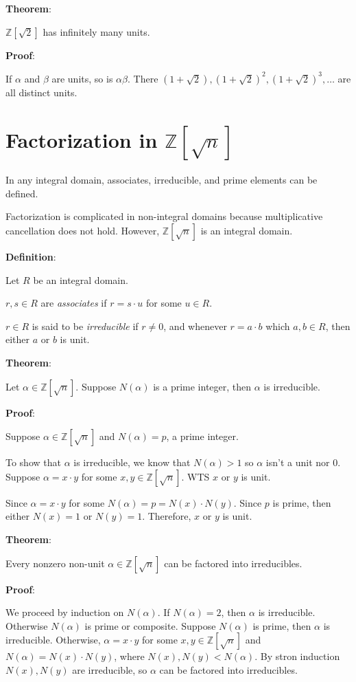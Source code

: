 \documentclass{article}
\begin{document}
\begin{multicols*}{2}
\textbf{Theorem}:

$\mathbb{Z}[\sqrt{2}]$ has infinitely many units.

\textbf{Proof}:

If $\alpha$ and $\beta$ are units, so is $\alpha\beta$. There $(1 + \sqrt{2}), (1 + \sqrt{2})^2, (1 + \sqrt{2})^3,\dots$ are all distinct units.

\section{Factorization in $\mathbb{Z}[\sqrt{n}]$}

In any integral domain, associates, irreducible, and prime elements can be defined.

Factorization is complicated in non-integral domains because multiplicative cancellation does not hold. However, $\mathbb{Z}[\sqrt{n}]$ is an integral domain.

\textbf{Definition}:

Let $R$ be an integral domain. 

$r, s \in R$ are \textit{associates} if $r = s \cdot u$ for some $u \in R$.

$r \in R$ is said to be \textit{irreducible} if $r \neq 0$, and whenever $r = a\cdot b$ which $a,b \in R$, then either $a$ or $b$ is unit.

\textbf{Theorem}:

Let $\alpha \in \mathbb{Z}[\sqrt{n}]$. Suppose $N(\alpha)$ is a prime integer, then $\alpha$ is irreducible.

\textbf{Proof}:

Suppose $\alpha \in \mathbb{Z}[\sqrt{n}]$ and $N(\alpha) = p$, a prime integer.

To show that $\alpha$ is irreducible, we know that $N(\alpha) > 1$ so $\alpha$ isn't a unit nor 0. Suppose $\alpha = x \cdot y$ for some $x, y \in \mathbb{Z}[\sqrt{n}]$. WTS $x$ or $y$ is unit.

Since $\alpha = x \cdot y$ for some $N(\alpha) = p = N(x) \cdot N(y)$. Since $p$ is prime, then either $N(x) = 1$ or $N(y)=1$. Therefore, $x$ or $y$ is unit.

\textbf{Theorem}:

Every nonzero non-unit $\alpha \in \mathbb{Z}[\sqrt{n}]$ can be factored into irreducibles.

\textbf{Proof}:

We proceed by induction on $N(\alpha)$. If $N(\alpha) = 2$, then $\alpha$ is irreducible. Otherwise $N(\alpha)$ is prime or composite. Suppose $N(\alpha)$ is prime, then $\alpha$ is irreducible. Otherwise, $\alpha = x \cdot y$ for some $x, y \in \mathbb{Z}[\sqrt{n}]$ and $N(\alpha) = N(x) \cdot N(y)$, where $N(x), N(y) < N(\alpha)$. By stron induction $N(x), N(y)$ are irreducible, so $\alpha$ can be factored into irreducibles.


\end{multicols*}
\end{document}
